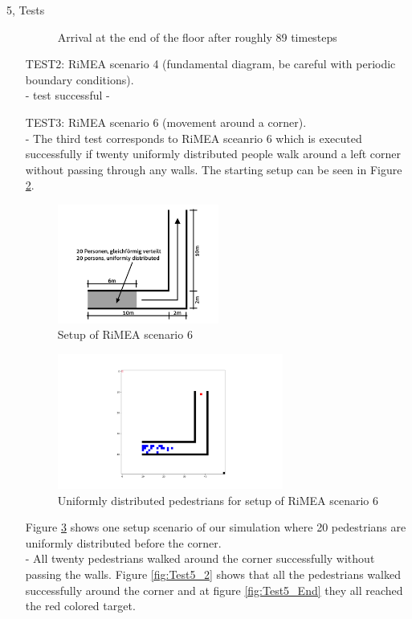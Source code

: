 \documentclass[10pt,a4paper]{article}
\begin{document}
\begin{task}{5, Tests}
\begin{enumerate}
\begin{figure}
    \caption{Arrival at the end of the floor after roughly 89 timesteps}
    \label{fig:result_test1}
\end{figure}
\item[TEST2:] RiMEA scenario 4 (fundamental diagram, be careful with periodic boundary conditions).\\
- test successful - 
\item[TEST3:] RiMEA scenario 6 (movement around a corner).\\
- The third test corresponds to RiMEA sceanrio 6 which is executed successfully if twenty uniformly distributed people walk around a left corner without passing through any walls. The starting setup can be seen in Figure \ref{fig:corner}.
\begin{figure}
    \centering
    \includegraphics[width=0.5\textwidth]{pictures/corner.png}
    \caption{Setup of RiMEA scenario 6}
    \label{fig:corner}
\end{figure}
\begin{figure}
    \centering
    \includegraphics[width=0.7\textwidth]{pictures/Test5.png}
    \caption{Uniformly distributed pedestrians for setup of RiMEA scenario 6}
    \label{fig:test5_1}
\end{figure}
Figure \ref{fig:test5_1} shows one setup scenario of our simulation where 20 pedestrians are uniformly distributed before the corner.\\
- All twenty pedestrians walked around the corner successfully without passing the walls. Figure \ref{fig:Test5_2} shows that all the pedestrians walked successfully around the corner and at figure \ref{fig:Test5_End} they all reached the red colored target.

\end{enumerate}
\end{task}
\end{document}
